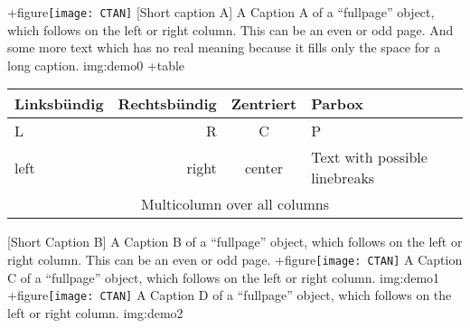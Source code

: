 \documentclass[twoside]{scrartcl}
\begin{document}
\Float[Multi]
\captionsetup{singlelinecheck=false}
\hvFloat[fullpage,capPos=l,multiFloat]%
  +{figure}{\texttt{[image: CTAN]}}%
   [Short caption A]%
   {A Caption A of a ``fullpage'' object, which follows on the left or
    right column. This can be an even or odd page. And some more text which has no
    real meaning because it fills only the space for a long caption.}%
   {img:demo0}%
  +{table}{\begin{tabular}{lrcp{3cm}}\hline                 %
            Linksbündig & Rechtsbündig & Zentriert & Parbox\\\hline
            L           & R            & C         & P\\
            left        & right        & center    & Text with possible linebreaks\\
            \multicolumn{4}{c}{Multicolumn over all columns}\\\hline
           \end{tabular}}%
   [Short Caption B]%
   {A Caption B of a ``fullpage'' object, which follows on the left or
        right column. This can be an even or odd page.}{}%
  +{figure}{\texttt{[image: CTAN]}}%
   {A Caption C of a ``fullpage'' object, which follows on the left or
      right column.}%
   {img:demo1}
  +{figure}{\texttt{[image: CTAN]}}%
   {A Caption D of a ``fullpage'' object, which follows on the left or
      right column.}%
   {img:demo2}



\blinddocument
\end{document}
